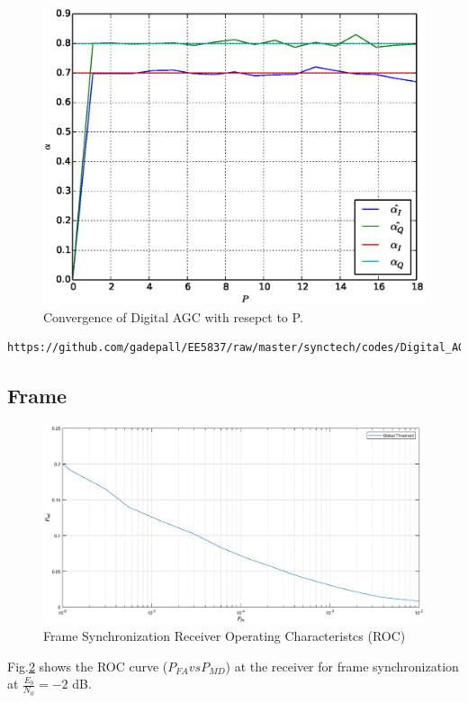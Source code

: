 \documentclass[journal,12pt,twocolumn]{IEEEtran}
\begin{document}
%
\begin{figure}[!ht]
\begin{center}
\includegraphics[width=\columnwidth]{./figs/Convergence_of_Digital_AGC.eps}
\end{center}
\caption{Convergence of Digital AGC with resepct to P.}
\label{fig:diffaoff}
\end{figure}

\begin{lstlisting}
https://github.com/gadepall/EE5837/raw/master/synctech/codes/Digital_AGC_with_fixed_SNR.py
\end{lstlisting}
%
%
\subsection{Frame}

\begin{figure}[!ht]
\begin{center}
\includegraphics[width=\columnwidth]{./figs/framesync.eps}
\end{center}
\caption{Frame Synchronization Receiver Operating Characteristcs (ROC)}
\label{fig:frameoff}
\end{figure}

Fig.\ref{fig:frameoff} shows the ROC curve ($P_{FA} vs P_{MD}$)  at the receiver for frame synchronization at $\frac{E_b}{N_0}=-2$ dB.

\end{document}
